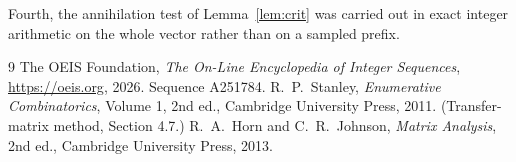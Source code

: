 \documentclass[11pt,a4paper]{article}
\theoremstyle{plain}
\theoremstyle{definition}
\begin{document}
Fourth, the annihilation test of Lemma~\ref{lem:crit} was carried out in exact integer
arithmetic on the whole vector rather than on a sampled prefix.

\begin{thebibliography}{9}
 The OEIS Foundation, \emph{The On-Line Encyclopedia of Integer
Sequences}, \url{https://oeis.org}, 2026. Sequence A251784.
 R.~P.~Stanley, \emph{Enumerative Combinatorics}, Volume 1, 2nd ed.,
Cambridge University Press, 2011. (Transfer-matrix method, Section 4.7.)
 R.~A.~Horn and C.~R.~Johnson, \emph{Matrix Analysis}, 2nd ed., Cambridge
University Press, 2013.
\end{thebibliography}
\end{document}
